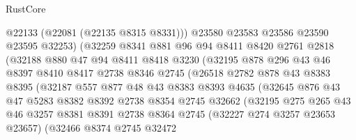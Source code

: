 \begin{lexlean}{RustCore}
\begin{coremodule}
                        @22133
                        (@22081 (@22135 @8315 @8331)))
                      @23580
                      @23583
                      @23586
                      @23590
                      @23595
                      @32253)
                    (@32259
                      @8341
                      @881
                      @96
                      @94
                      @8411
                      @8420
                      @2761
                      @2818
                      (@32188
                        @880
                        @47
                        @94
                        @8411
                        @8418
                        @3230
                        (@32195
                          @878
                          @296
                          @43
                          @46
                          @8397
                          @8410
                          @8417
                          @2738
                          @8346
                          @2745
                          (@26518
                            @2782
                            @878
                            @43
                            @8383
                            @8395
                            (@32187
                              @557
                              @877
                              @48
                              @43
                              @8383
                              @8393
                              @4635
                              (@32645
                                @876
                                @43
                                @47
                                @5283
                                @8382
                                @8392
                                @2738
                                @8354
                                @2745
                                @32662
                                (@32195
                                  @275
                                  @265
                                  @43
                                  @46
                                  @3257
                                  @8381
                                  @8391
                                  @2738
                                  @8364
                                  @2745
                                  (@32227 @274 @3257 @23653 @23657)
                                  (@32466
                                    @8374
                                    @2745
                                    @32472

\end{coremodule}
\end{lexlean}

